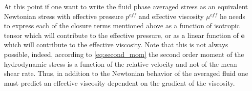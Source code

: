 
At this point if one want to write the fluid phase averaged stress as an equivalent Newtonian stress with effective pressure $p^{eff}$ and effective viscosity $\mu^{eff}$ he needs to express each of the closure terms mentioned above as a function of isotropic tensor which will contribute to the effective pressure, or as a linear function of  $\textbf{e}$ which will contribute to the effective viscosity. 
Note that this is not always possible, indeed, according to \ref{eq:second_mom} the second order moment of the hydrodynamic stress is a function of the relative velocity and not of the mean shear rate. 
Thus, in addition to the Newtonian behavior of the averaged fluid one must predict an effective viscosity dependent on the gradient of the viscosity. 

